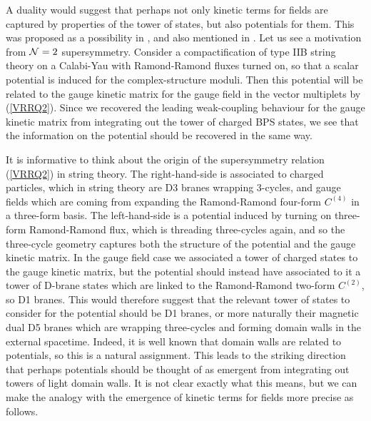 \documentclass[11pt,a4paper]{article}
\numberwithin{equation}{section}
\numberwithin{table}{section}\setlength{\multlinegap}{25pt}
\begin{document}
{A duality would suggest that perhaps not only kinetic terms for fields are captured by properties of the tower of states, but also potentials for them. This was proposed as a possibility in \cite{Ooguri:2018wrx}, and also mentioned in \cite{Grimm:2018cpv}. Let us see a motivation from ${\cal N}=2$ supersymmetry. Consider a compactification of type IIB string theory on a Calabi-Yau with Ramond-Ramond fluxes turned on, so that a scalar potential is induced for the complex-structure moduli. Then this potential will be related to the gauge kinetic matrix for the gauge field in the vector multiplets by (\ref{VRRQ2}). Since we recovered the leading weak-coupling behaviour for the gauge kinetic matrix from integrating out the tower of charged BPS states, we see that the information on the potential should be recovered in the same way.

It is informative to think about the origin of the supersymmetry relation (\ref{VRRQ2}) in string theory. The right-hand-side is associated to charged particles, which in string theory are D3 branes wrapping 3-cycles, and gauge fields which are coming from expanding the Ramond-Ramond four-form $C^{(4)}$ in a three-form basis. The left-hand-side is a potential induced by turning on three-form Ramond-Ramond flux, which is threading three-cycles again, and so the three-cycle geometry captures both the structure of the potential and the gauge kinetic matrix. In the gauge field case we associated a tower of charged states to the gauge kinetic matrix, but the potential should instead have associated to it a tower of D-brane states which are linked to the Ramond-Ramond two-form $C^{(2)}$, so D1 branes. This would therefore suggest that the relevant tower of states to consider for the potential should be D1 branes, or more naturally their magnetic dual D5 branes which are wrapping three-cycles and forming domain walls in the external spacetime. Indeed, it is well known that domain walls are related to potentials, so this is a natural assignment. This leads to the striking direction that perhaps potentials should be thought of as emergent from integrating out towers of light domain walls. It is not clear exactly what this means, but we can make the analogy with the emergence of kinetic terms for fields more precise as follows. 

}
\end{document}
